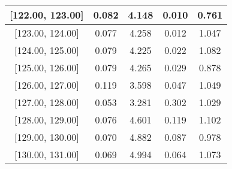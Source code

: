 \documentclass[12pt]{article}
\begin{document}
\begin{table}[]
\begin{tabular}{c|c|c|c|c|}
\multicolumn{1}{|c|}{{[}122.00,  123.00{]}}  & 0.082 & 4.148 & 0.010 & 0.761 \\ \hline 
\multicolumn{1}{|c|}{{[}123.00,  124.00{]}}  & 0.077 & 4.258 & 0.012 & 1.047 \\ \hline 
\multicolumn{1}{|c|}{{[}124.00,  125.00{]}}  & 0.079 & 4.225 & 0.022 & 1.082 \\ \hline 
\multicolumn{1}{|c|}{{[}125.00,  126.00{]}}  & 0.079 & 4.265 & 0.029 & 0.878 \\ \hline 
\multicolumn{1}{|c|}{{[}126.00,  127.00{]}}  & 0.119 & 3.598 & 0.047 & 1.049 \\ \hline 
\multicolumn{1}{|c|}{{[}127.00,  128.00{]}}  & 0.053 & 3.281 & 0.302 & 1.029 \\ \hline 
\multicolumn{1}{|c|}{{[}128.00,  129.00{]}}  & 0.076 & 4.601 & 0.119 & 1.102 \\ \hline 
\multicolumn{1}{|c|}{{[}129.00,  130.00{]}}  & 0.070 & 4.882 & 0.087 & 0.978 \\ \hline 
\multicolumn{1}{|c|}{{[}130.00,  131.00{]}}  & 0.069 & 4.994 & 0.064 & 1.073 \\ \hline 
\end{tabular}
\end{table}
\end{document}
